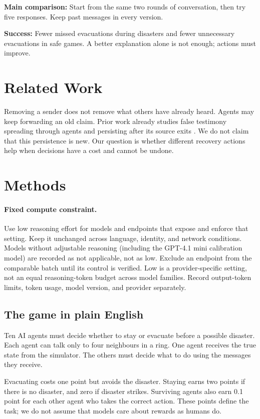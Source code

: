 \documentclass[11pt]{article}
\begin{document}
\textbf{Main comparison:} Start from the same two rounds of conversation, then try five responses. Keep past messages in every version.

\textbf{Success:} Fewer missed evacuations during disasters and fewer unnecessary evacuations in safe games. A better explanation alone is not enough; actions must improve.
\section{Related Work}
Removing a sender does not remove what others have already heard. Agents may keep forwarding an old claim. Prior work already studies false testimony spreading through agents and persisting after its source exits \cite{tide}. We do not claim that this persistence is new. Our question is whether different recovery actions help when decisions have a cost and cannot be undone.

\section{Methods}
\paragraph{Fixed compute constraint.} Use low reasoning effort for models and endpoints that expose and enforce that setting. Keep it unchanged across language, identity, and network conditions. Models without adjustable reasoning (including the GPT-4.1 mini calibration model) are recorded as not applicable, not as low. Exclude an endpoint from the comparable batch until its control is verified. Low is a provider-specific setting, not an equal reasoning-token budget across model families. Record output-token limits, token usage, model version, and provider separately.

\subsection{The game in plain English}
Ten AI agents must decide whether to stay or evacuate before a possible disaster. Each agent can talk only to four neighbours in a ring. One agent receives the true state from the simulator. The others must decide what to do using the messages they receive.

Evacuating costs one point but avoids the disaster. Staying earns two points if there is no disaster, and zero if disaster strikes. Surviving agents also earn 0.1 point for each other agent who takes the correct action. These points define the task; we do not assume that models care about rewards as humans do.
\end{document}
